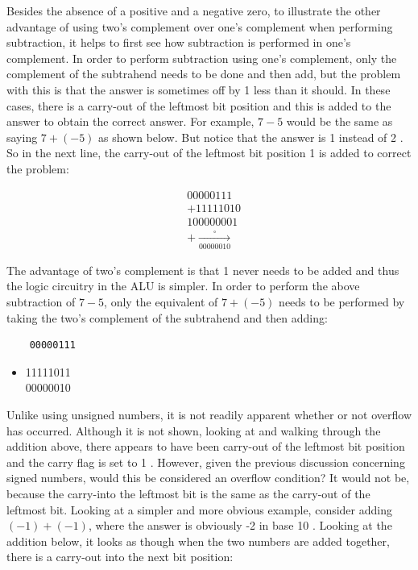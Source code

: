 \documentclass[10pt]{book}
\begin{document}
Besides the absence of a positive and a negative zero, to illustrate the other advantage of using two's complement over one's complement when performing subtraction, it helps to first see how subtraction is performed in one's complement. In order to perform subtraction using one's complement, only the complement of the subtrahend needs to be done and then add, but the problem with this is that the answer is sometimes off by 1 less than it should. In these cases, there is a carry-out of the leftmost bit position and this is added to the answer to obtain the correct answer. For example, $7-5$ would be the same as saying $7+(-5)$ as shown below. But notice that the answer is 1 instead of 2 . So in the next line, the carry-out of the leftmost bit position 1 is added to correct the problem:

$$
\begin{aligned}
& 00000111 \\
& +11111010 \\
& 100000001 \\
& +\xrightarrow[00000010]{\square}
\end{aligned}
$$

The advantage of two's complement is that 1 never needs to be added and thus the logic circuitry in the ALU is simpler. In order to perform the above subtraction of $7-5$, only the equivalent of $7+(-5)$ needs to be performed by taking the two's complement of the subtrahend and then adding:

\begin{verbatim}
    00000111
\end{verbatim}

\begin{itemize}
  \item 11111011\\
00000010
\end{itemize}

Unlike using unsigned numbers, it is not readily apparent whether or not overflow has occurred. Although it is not shown, looking at and walking through the addition above, there appears to have been carry-out of the leftmost bit position and the carry flag is set to 1 . However, given the previous discussion concerning signed numbers, would this be considered an overflow condition? It would not be, because the carry-into the leftmost bit is the same as the carry-out of the leftmost bit. Looking at a simpler and more obvious example, consider adding $(-1)+(-1)$, where the answer is obviously -2 in base 10 . Looking at the addition below, it looks as though when the two numbers are added together, there is a carry-out into the next bit position:
\end{document}
